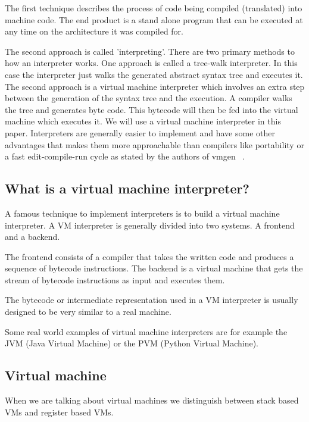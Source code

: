 \documentclass{article}
\begin{document}
The first technique describes the process of code being compiled (translated)
into machine code. The end product is a stand alone program that can be
executed at any time on the architecture it was compiled for.

The second approach is called 'interpreting'. There are two primary methods to
how an interpreter works. One approach is called a tree-walk interpreter. In
this case the interpreter just walks the generated abstract syntax tree and
executes it. The second approach is a virtual machine interpreter which
involves an extra step between the generation of the syntax tree and the
execution. A compiler walks the tree and generates byte code. This bytecode
will then be fed into the virtual machine which executes it. We will use a
virtual machine interpreter in this paper. Interpreters are generally easier to
implement and have some other advantages that makes them more approachable than
compilers like portability or a fast edit-compile-run cycle as stated by the
authors of vmgen ~\cite{vmgen}. 


\subsection{What is a virtual machine interpreter?}
A famous technique to implement interpreters is to build a virtual machine
interpreter. A VM interpreter is generally divided into two systems. A frontend
and a backend. ~\cite{vmgen}

The frontend consists of a compiler that takes the written code and produces a
sequence of bytecode instructions. The backend is a virtual machine that gets
the stream of bytecode instructions as input and executes them. ~\cite{vmgen}

The bytecode or intermediate representation used in a VM interpreter is usually
designed to be very similar to a real machine. ~\cite{vmgen}

Some real world examples of virtual machine interpreters are for example the
JVM (Java Virtual Machine) or the PVM (Python Virtual Machine).


\subsection{Virtual machine}
When we are talking about virtual machines we distinguish between stack based VMs and 
register based VMs.
\end{document}
